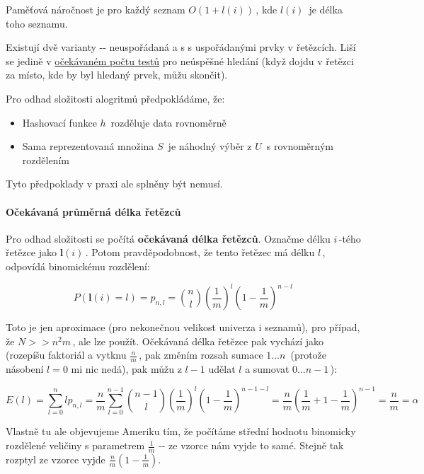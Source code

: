 Paměťová náročnost je pro každý seznam \(O(1+l(i))\,\!\), kde
\(l(i)\,\!\) je délka toho seznamu.

Existují dvě varianty -\/- neuspořádaná a s s uspořádanými prvky v
řetězcích. Liší se jedině v
\protect\hyperlink{Oux10dekuxe1vanuxfd_poux10det_testux16f}{očekávaném
počtu testů} pro neúspěšné hledání (když dojdu v řetězci za místo, kde
by byl hledaný prvek, můžu skončit).

Pro odhad složitosti alogritmů předpokládáme, že:

\begin{itemize}
\tightlist
\item
  Hashovací funkce \(h\,\!\) rozděluje data rovnoměrně
\item
  Sama reprezentovaná množina \(S\,\!\) je náhodný výběr z \(U\,\!\) s
  rovnoměrným rozdělením
\end{itemize}

Tyto předpoklady v praxi ale splněny být nemusí.

\paragraph{Očekávaná průměrná délka
řetězců}\label{oux10dekuxe1vanuxe1-prux16fmux11brnuxe1-duxe9lka-ux159etux11bzcux16f}

Pro odhad složitosti se počítá \textbf{očekávaná délka řetězců}. Označme
délku \(i\,\!\)-tého řetězce jako \(\mathbf{l}(i)\,\!\). Potom
pravděpodobnost, že tento řetězec má délku \(l\,\!\), odpovídá
binomickému rozdělení:

\[P(\mathbf{l}(i) = l) = p_{n,l} = \mathbf{}\binom{n}{l}\left(\frac{1}{m}\right)^{l}\left(1-\frac{1}{m}\right)^{n-l}\,\!\]

Toto je jen aproximace (pro nekonečnou velikost univerza i seznamů), pro
případ, že \(N>>n^2 m\,\!\), ale lze použít. Očekávaná délka řetězce pak
vychází jako (rozepíšu faktoriál a vytknu \(\frac{n}{m}\,\!\), pak
změním rozsah sumace \(1\dots n\,\!\) (protože násobení \(l=0\) mi nic
nedá), pak můžu z \(l-1\) udělat \(l\) a sumovat \(0\dots n-1\,\!\)):

\[E(l)=\sum_{l=0}^{n}lp_{n,l}=\frac{n}{m}\sum_{l=0}^{n-1}\mathbf{}\binom{n-1}{l}(\frac{1}{m})^l(1-\frac{1}{m})^{n-1-l}=\frac{n}{m}(\frac{1}{m}+1-\frac{1}{m})^{n-1}=\frac{n}{m}=\alpha\,\!\]

Vlastně tu ale objevujeme Ameriku tím, že počítáme střední hodnotu
binomicky rozdělené veličiny s parametrem \(\frac{1}{m}\) -\/- ze vzorce
nám vyjde to samé. Stejně tak rozptyl ze vzorce vyjde
\(\frac{n}{m}\left(1 - \frac{1}{m}\right)\).

